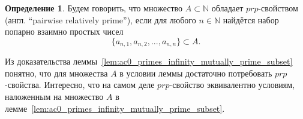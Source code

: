 \documentclass[a4paper,openbib]{article}
\theoremstyle{definition}
\newtheorem{definition}[lemma]{Определение}
\begin{document}
\begin{definition}
	Будем говорить, что множество $A\subset\mathbb{N}$ обладает $prp$-свойством (англ. ``pairwise relatively prime''),
	если для любого $n\in\mathbb{N}$ найдётся набор попарно взаимно простых чисел
	\begin{equation}
		\{a_{n,1}, a_{n,2}, ..., a_{n,n}  \} \subset A
		.
	\end{equation}
\end{definition}

Из доказательства леммы~\ref{lem:ac0_primes_infinity_mutually_prime_subset} понятно,
что для множества $A$ в условии леммы достаточно потребовать $prp$-свойства.
Интересно, что на самом деле $prp$-свойство эквивалентно условиям,
наложенным на множество $A$ в лемме~\ref{lem:ac0_primes_infinity_mutually_prime_subset}.
\end{document}

